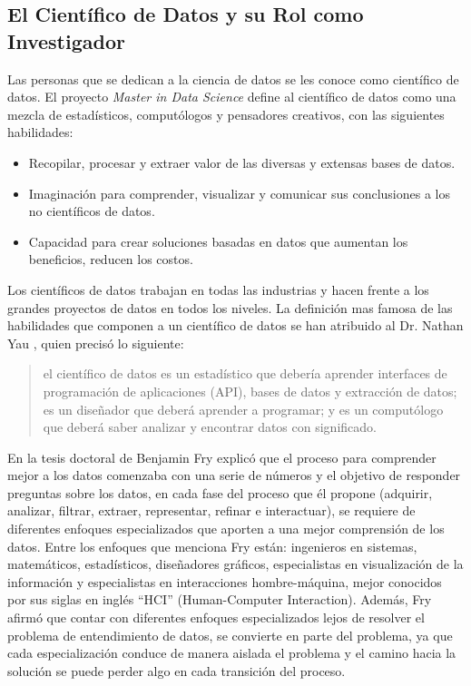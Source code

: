 \begin{spacing}{1.5}
\subsection{El Científico de Datos y su Rol como Investigador}
Las personas que se dedican a la ciencia de datos se les conoce como científico de datos. El proyecto \textit{Master in Data Science} define al científico de datos como una mezcla de estadísticos, computólogos y pensadores creativos, con las siguientes habilidades:

\begin{itemize}
	\item Recopilar, procesar y extraer valor de las diversas y extensas bases de datos.
	\item Imaginación para comprender, visualizar y comunicar sus conclusiones a los no científicos de datos.
	\item Capacidad para crear soluciones basadas en datos que aumentan los beneficios, reducen los costos.
\end{itemize}

Los científicos de datos trabajan en todas las industrias y hacen frente a los grandes proyectos de datos en todos los niveles. La definición mas famosa de las habilidades que componen a un científico de datos se han atribuido al Dr. Nathan Yau \cite{yau}, quien precisó lo siguiente: \begin{quote} el científico de datos es un estadístico que debería aprender interfaces de programación de aplicaciones (API), bases de datos y extracción de datos; es un diseñador que deberá aprender a programar; y es un computólogo que deberá saber analizar y encontrar datos con significado. \end{quote}

En la tesis doctoral de Benjamin Fry \cite{fry} explicó que el proceso para comprender mejor a los datos comenzaba con una serie de números y el objetivo de responder preguntas sobre los datos, en cada fase del proceso que él propone (adquirir, analizar, filtrar, extraer, representar, refinar e interactuar), se requiere de diferentes enfoques especializados que aporten a una mejor comprensión de los datos. Entre los enfoques que menciona Fry están: ingenieros en sistemas, matemáticos, estadísticos, diseñadores gráficos, especialistas en visualización de la información y especialistas en interacciones hombre-máquina, mejor conocidos por sus siglas en inglés “HCI” (Human-Computer Interaction). Además, Fry afirmó que contar con diferentes enfoques especializados lejos de resolver el problema de entendimiento de datos, se convierte en parte del problema, ya que cada especialización conduce de manera aislada el problema y el camino hacia la solución se puede perder algo en cada transición del proceso.


\end{spacing}
